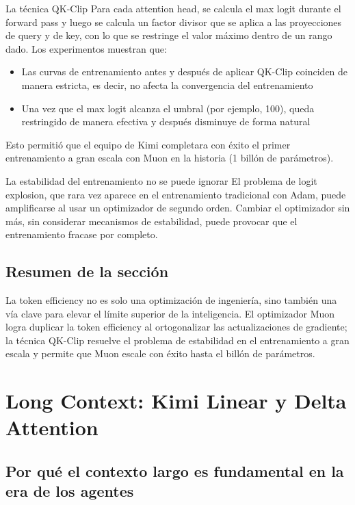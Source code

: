 \documentclass[a4paper]{article}
\begin{document}
\begin{importantbox}{La técnica QK-Clip}
Para cada attention head, se calcula el max logit durante el forward pass y luego se calcula un factor divisor que se aplica a las proyecciones de query y de key, con lo que se restringe el valor máximo dentro de un rango dado. Los experimentos muestran que:
\begin{itemize}
    \item Las curvas de entrenamiento antes y después de aplicar QK-Clip coinciden de manera estricta, es decir, no afecta la convergencia del entrenamiento
    \item Una vez que el max logit alcanza el umbral (por ejemplo, 100), queda restringido de manera efectiva y después disminuye de forma natural
\end{itemize}
Esto permitió que el equipo de Kimi completara con éxito el primer entrenamiento a gran escala con Muon en la historia (1 billón de parámetros).
\end{importantbox}

\begin{warningbox}{La estabilidad del entrenamiento no se puede ignorar}
El problema de logit explosion, que rara vez aparece en el entrenamiento tradicional con Adam, puede amplificarse al usar un optimizador de segundo orden. Cambiar el optimizador sin más, sin considerar mecanismos de estabilidad, puede provocar que el entrenamiento fracase por completo.
\end{warningbox}

\subsection{Resumen de la sección}

La token efficiency no es solo una optimización de ingeniería, sino también una vía clave para elevar el límite superior de la inteligencia. El optimizador Muon logra duplicar la token efficiency al ortogonalizar las actualizaciones de gradiente; la técnica QK-Clip resuelve el problema de estabilidad en el entrenamiento a gran escala y permite que Muon escale con éxito hasta el billón de parámetros.

\section{Long Context: Kimi Linear y Delta Attention}

\subsection{Por qué el contexto largo es fundamental en la era de los agentes}
\end{document}
